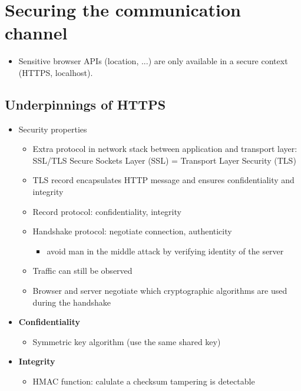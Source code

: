 \documentclass[12pt,titlepage,a4paper]{report}
\begin{document}
	\section{Securing the communication channel}
	\begin{itemize}
		\item Sensitive browser APIs (location, ...) are only available in a secure context (HTTPS, localhost).
	\end{itemize}

	\subsection{Underpinnings of HTTPS}
	\begin{itemize}
		\item Security properties
		\begin{itemize}
			\item Extra protocol in network stack between application and transport layer: SSL/TLS
				\subitem Secure Sockets Layer (SSL) = Transport Layer Security (TLS)
			\item TLS record encapsulates HTTP message and ensures confidentiality and integrity
			\item Record protocol: confidentiality, integrity
			\item Handshake protocol: negotiate connection, authenticity
			\begin{itemize}
				\item avoid man in the middle attack by verifying identity of the server
			\end{itemize}
			\item Traffic can still be observed
			\item Browser and server negotiate which cryptographic algorithms are used during the handshake
		\end{itemize}
	
		\item \textbf{Confidentiality}
		\begin{itemize}
			\item Symmetric key algorithm (use the same shared key)
		\end{itemize}
	
		\item \textbf{Integrity}
		\begin{itemize}
			\item HMAC function: calulate a checksum
			\subitem tampering is detectable
		\end{itemize}
	

\end{itemize}
\end{document}
